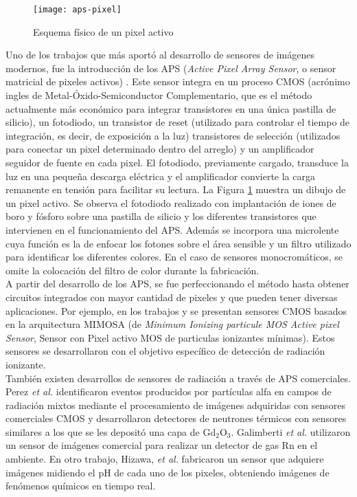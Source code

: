 \begin{figure}[t]
	\centering
	\texttt{[image: aps-pixel]}
	\caption{Esquema físico de un pixel activo\cite{Turchetta2019}}
	\label{fig:pix}
\end{figure}

Uno de los trabajos que más aportó al desarrollo de sensores de imágenes modernos, fue la introducción de los APS ({\it Active Pixel Array Sensor}, o sensor matricial de pixeles activos) \cite{Mendis1994}. Este sensor integra en un proceso CMOS (acrónimo ingles de Metal-Óxido-Semiconductor Complementario, que es el método actualmente más económico para integrar transistores en una única pastilla de silicio), un fotodiodo, un transistor de reset (utilizado para controlar el tiempo de integración, es decir, de exposición a la luz) transistores de selección (utilizados para conectar un pixel determinado dentro del arreglo) y un amplificador seguidor de fuente en cada pixel\cite{Turchetta2019}. El fotodiodo, previamente cargado, transduce la luz en una pequeña descarga eléctrica y el amplificador convierte la carga remanente en tensión para facilitar su lectura. La Figura \ref{fig:pix} muestra un dibujo de un pixel activo. Se observa el fotodiodo realizado con implantación de iones de boro y fósforo sobre una pastilla de silicio y los diferentes transistores que intervienen en el funcionamiento del APS. Además se incorpora una microlente cuya función es la de enfocar los fotones sobre el área sensible y un filtro utilizado para identificar los diferentes colores. En el caso de sensores monocromáticos, se omite la colocación del filtro de color durante la fabricación.\\

A partir del desarrollo de los APS, se fue perfeccionando el método hasta obtener circuitos integrados con mayor cantidad de pixeles y que pueden tener diversas aplicaciones. Por ejemplo, en los trabajos \cite{Hu-Guo2009} y \cite{Baudot2009} se presentan sensores CMOS basados en la arquitectura MIMOSA (de {\it Minimum Ionizing particule MOS Active pixel Sensor}, Sensor con Pixel activo MOS de particulas ionizantes mínimas). Estos sensores se desarrollaron con el objetivo específico de detección de radiación ionizante.\\

También existen desarrollos de sensores de radiación a través de APS comerciales. Perez {\it et al.} identificaron eventos producidos por partículas alfa en campos de radiación mixtos mediante el procesamiento de imágenes adquiridas con sensores comerciales CMOS\cite{Perez2016} y desarrollaron detectores de neutrones térmicos con sensores similares a los que se les depositó una capa de Gd$_2$O$_3$\cite{Perez2018Thermal}. Galimberti {\it et al.} utilizaron un sensor de imágenes comercial para realizar un detector de gas Rn en el ambiente\cite{Galimberti2018}. En otro trabajo, Hizawa, {\it et al.} fabricaron un sensor que adquiere imágenes midiendo el pH de cada uno de los pixeles\cite{Hizawa2007}, obteniendo imágenes de fenómenos químicos en tiempo real.\\

